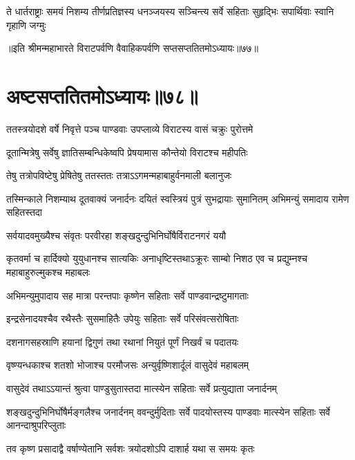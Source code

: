 \fourlineindentedshloka
{ते धार्तराष्ट्राः समयं निशम्य}
{तीर्णप्रतिज्ञस्य धनञ्जयस्य }
{सञ्चिन्त्य सर्वे सहिताः सुहृद्भिः}
{सपार्थिवाः स्वानि गृहाणि जग्मुः}

॥इति श्रीमन्महाभारते विराटपर्वणि वैवाहिकपर्वणि सप्तसप्ततितमोऽध्यायः॥७७॥

\chapter{अष्टसप्ततितमोऽध्यायः॥७८॥ }

\twolineshloka
{ततस्त्रयोदशे वर्षे निवृत्ते पञ्च पाण्डवाः}
{उपप्लाव्ये विराटस्य वासं चक्रुः पुरोत्तमे}


\twolineshloka
{दूतान्मित्रेषु सर्वेषु ज्ञातिसम्बन्धिकेष्वपि}
{प्रेषयामास कौन्तेयो विराटश्च महीपतिः}


\twolineshloka
{तेषु तत्रोपविष्टेषु प्रेषितेषु ततस्ततः}
{तत्राऽऽगमन्महाबाहुर्वनमाली बलानुजः}


\threelineshloka
{तस्मिन्काले निशम्याथ दूतवाक्यं जनार्दनः}
{दयितं स्वस्त्रियं पुत्रं सुभद्रायाः सुमानितम्}
{अभिमन्युं समादाय रामेण सहितस्तदा}


\twolineshloka
{सर्वयादवमुख्यैश्च संवृतः परवीरहा}
{शङ्खदुन्दुभिनिर्घोषैर्विराटनगरं ययौ}


\threelineshloka
{कृतवर्मा च हार्दिक्यो युयुधानश्च सात्यकिः}
{अनाधृष्टिस्तथाऽक्रूरः साम्बो निशठ एव च}
{प्रद्युम्नश्च महाबाहुरुल्मुकश्च महाबलः}


\twolineshloka
{अभिमन्युमुपादाय सह मात्रा परन्तपाः}
{कृष्णेन सहिताः सर्वे पाण्डवान्द्रष्टुमागताः}


\twolineshloka
{इन्द्रसेनादयश्चैव रथैस्तैः सुसमाहितैः}
{उपेयुः सहिताः सर्वे परिसंवत्सरोषिताः}


\twolineshloka
{दशनागसहस्राणि हयानां द्विगुणं तथा}
{रथानां नियुतं पूर्णं निखर्वं च पदातयः}


\twolineshloka
{वृष्ण्यन्धकाश्च शतशो भोजाश्च परमौजसः}
{अन्युर्वृष्णिशार्दूलं वासुदेवं महाबलम्}


\twolineshloka
{वासुदेवं तथाऽऽयान्तं श्रुत्वा पाण्डुसुतास्तदा}
{मात्स्येन सहिताः सर्वे प्रत्युद्याता जनार्दनम्}


\threelineshloka
{शङ्खदुन्दुभिनिर्घोषैर्मङ्गलैश्च जनार्दनम्}
{ववन्दुर्मुदिताः सर्वे पादयोस्तस्य पाण्डवाः}
{मात्स्येन सहिताः सर्वे आनन्दाश्रुपरिप्लुताः}


\twolineshloka
{तव कृष्ण प्रसादाद्वै वर्षाण्येतानि सर्वशः}
{त्रयोदशोऽपि दाशार्ह यथा स समयः कृतः}


